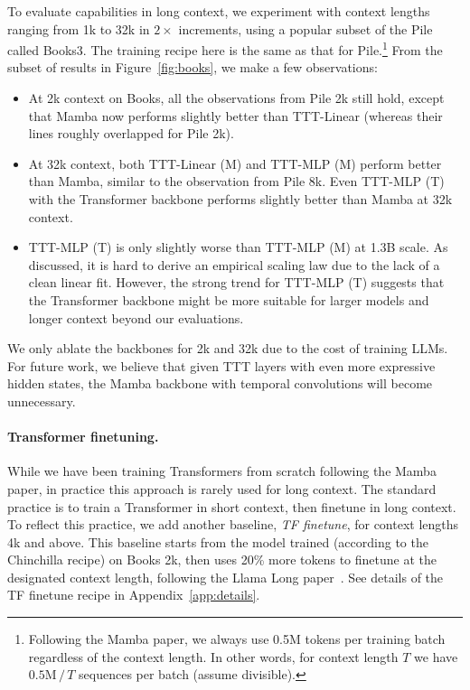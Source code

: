 \documentclass{article}
\begin{document}
To evaluate capabilities in long context, we experiment with context lengths ranging from 1k to 32k in $2\times$ increments, using a popular subset of the Pile called Books3. 
The training recipe here is the same as that for Pile.\footnote{\label{foot:bs}
Following the Mamba paper, we always use 0.5M tokens per training batch regardless of the context length. In other words, for context length $T$ we have $0.5\text{M}\,/\,T$ sequences per batch (assume divisible).
}
From the subset of results in Figure~\ref{fig:books}, we make a few observations:
\begin{itemize}[leftmargin=*]
    \item At 2k context on Books, all the observations from Pile 2k still hold, except that Mamba now performs slightly better than TTT-Linear (whereas their lines roughly overlapped for Pile 2k).
    \item At 32k context, both TTT-Linear (M) and TTT-MLP (M) perform better than Mamba, similar to the observation from Pile 8k. Even TTT-MLP (T) with the Transformer backbone performs slightly better than Mamba at 32k context.
    \item TTT-MLP (T) is only slightly worse than TTT-MLP (M) at 1.3B scale. 
    As discussed, it is hard to derive an empirical scaling law due to the lack of a clean linear fit. However, the strong trend for TTT-MLP (T) suggests that the Transformer backbone might be more suitable for larger models and longer context beyond our evaluations.
\end{itemize}
We only ablate the backbones for 2k and 32k due to the cost of training LLMs. For future work, we believe that given TTT layers with even more expressive hidden states, the Mamba backbone with temporal convolutions will become unnecessary.

\paragraph{Transformer finetuning.}
While we have been training Transformers from scratch following the Mamba paper, in practice this approach is rarely used for long context.
The standard practice is to train a Transformer in short context, then finetune in long context.
To reflect this practice, we add another baseline, \emph{TF finetune}, for context lengths 4k and above.
This baseline starts from the model trained (according to the Chinchilla recipe) on Books 2k, then uses 20\% more tokens to finetune at the designated context length, following the Llama Long paper~\cite{xiong2023effective}.
See details of the TF finetune recipe in Appendix~\ref{app:details}.
\end{document}
